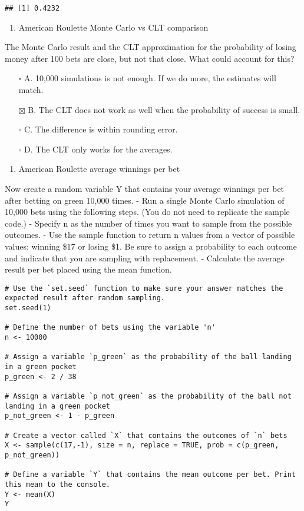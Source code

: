 \documentclass[
]{article}
\providecommand{\tightlist}{%
  \setlength{\itemsep}{0pt}\setlength{\parskip}{0pt}}
\begin{document}
\begin{verbatim}
## [1] 0.4232
\end{verbatim}

\begin{enumerate}
\def\labelenumi{\arabic{enumi}.}
\setcounter{enumi}{3}
\tightlist
\item
  American Roulette Monte Carlo vs CLT comparison
\end{enumerate}

The Monte Carlo result and the CLT approximation for the probability of
losing money after 100 bets are close, but not that close. What could
account for this?

\begin{itemize}
\tightlist
\item[$\square$]
  A. 10,000 simulations is not enough. If we do more, the estimates will
  match.
\item[$\boxtimes$]
  B. The CLT does not work as well when the probability of success is
  small.
\item[$\square$]
  C. The difference is within rounding error.
\item[$\square$]
  D. The CLT only works for the averages.
\end{itemize}

\begin{enumerate}
\def\labelenumi{\arabic{enumi}.}
\setcounter{enumi}{4}
\tightlist
\item
  American Roulette average winnings per bet
\end{enumerate}

Now create a random variable Y that contains your average winnings per
bet after betting on green 10,000 times. - Run a single Monte Carlo
simulation of 10,000 bets using the following steps. (You do not need to
replicate the sample code.) - Specify n as the number of times you want
to sample from the possible outcomes. - Use the sample function to
return n values from a vector of possible values: winning \$17 or losing
\$1. Be sure to assign a probability to each outcome and indicate that
you are sampling with replacement. - Calculate the average result per
bet placed using the mean function.

\begin{verbatim}
# Use the `set.seed` function to make sure your answer matches the expected result after random sampling.
set.seed(1)

# Define the number of bets using the variable 'n'
n <- 10000

# Assign a variable `p_green` as the probability of the ball landing in a green pocket
p_green <- 2 / 38

# Assign a variable `p_not_green` as the probability of the ball not landing in a green pocket
p_not_green <- 1 - p_green

# Create a vector called `X` that contains the outcomes of `n` bets
X <- sample(c(17,-1), size = n, replace = TRUE, prob = c(p_green, p_not_green))

# Define a variable `Y` that contains the mean outcome per bet. Print this mean to the console.
Y <- mean(X)
Y
\end{verbatim}
\end{document}
